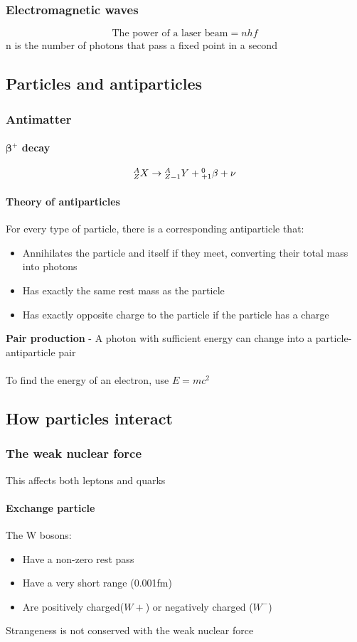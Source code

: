 \documentclass{article}[18pt]
\begin{document}
\subsubsection{Electromagnetic waves}
$$\text{The power of a laser beam}=nhf$$
n is the number of photons that pass a fixed point in a second
\subsection{Particles and antiparticles}
\subsubsection{Antimatter}
\paragraph{$\mathbf{\beta^+}$ decay}
$$\mathsmaller{^A_Z}X\rightarrow\mathsmaller{^{A}_{Z-1}}Y+\mathsmaller{^0_{+1}}\beta+\nu$$
\paragraph{Theory of antiparticles}
For every type of particle, there is a corresponding antiparticle that:
\begin{itemize}
\item Annihilates the particle and itself if they meet, converting their total mass into photons
\item Has exactly the same rest mass as the particle
\item Has exactly opposite charge to the particle if the particle has a charge
\end{itemize}
\textbf{Pair production} - A photon with sufficient energy can change into a particle-antiparticle pair\\
\\
To find the energy of an electron, use $E=mc^2$
\subsection{How particles interact}
\subsubsection{The weak nuclear force}
This affects both leptons and quarks\\
\paragraph{Exchange particle}
The W bosons:
\begin{itemize}
\item Have a non-zero rest pass
\item Have a very short range (0.001fm)
\item Are positively charged($W+$) or negatively charged ($W^-$)
\end{itemize}
Strangeness is not conserved with the weak nuclear force
\end{document}
